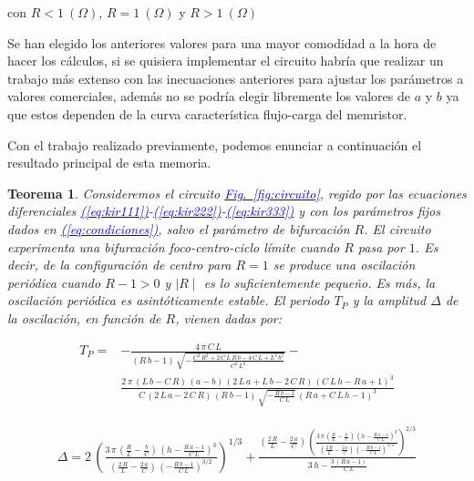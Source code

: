 \documentclass[12pt,a4paper]{report} %
\newtheorem{theorem}{Teorema}[chapter]
\newcommand{\fref}[1]{\hyperref[#1]{\textcolor{blue}{Fig.~\ref*{#1}}}}
\newcommand{\eref}[1]{\hyperref[#1]{\textcolor{blue}{(\ref*{#1})}}}
\begin{document}
	\noindent \noindent con $R<1\:(\Omega)$, $R=1\:(\Omega)$ y $R>1\:(\Omega)$
	
	\vspace{0.5cm} Se han elegido los anteriores valores para una mayor comodidad a la hora de hacer los cálculos, si se quisiera implementar el circuito habría que realizar un trabajo más extenso con las inecuaciones anteriores para ajustar los parámetros a valores comerciales, además no se podría elegir libremente los valores de $a$ y $b$ ya que estos dependen de la curva característica flujo-carga del memristor.
	
	\vspace{0.5cm} Con el trabajo realizado previamente, podemos enunciar a continuación el resultado principal de esta memoria.
	
	\begin{theorem}
		\label{teo.principal}
		Consideremos el circuito \fref{fig:circuito}, regido por las ecuaciones diferenciales \eref{eq:kir111}-\eref{eq:kir222}-\eref{eq:kir333} y con los parámetros fijos dados en \eref{eq:condiciones}, salvo el parámetro de bifurcación $R$. El circuito experimenta una bifurcación foco-centro-ciclo límite cuando $R$ pasa por $1$. Es decir, de la configuración de centro para $R=1$ se produce una oscilación periódica  cuando $R-1>0$ y $\mid R \mid$ es lo suficientemente pequeño. Es más, la oscilación periódica es asintóticamente estable. El periodo $T_P$ y la amplitud $\varDelta$ de la oscilación, en función de $R$, vienen dadas por:
		
		\begin{equation}
			\label{eq:perR}
			\begin{aligned}
			T_P=&-\frac{4\,\pi \,C\,L}{\left(R\,b-1\right)\,\sqrt{-\frac{C^2\,R^2+2\,C\,L\,R\,b-4\,C\,L+L^2\,b^2}{C^2\,L^2}}}- \\
			&\frac{2\,\pi \,\left(L\,b-C\,R\right)\,\left(a-b\right)\,\left(2\,L\,a+L\,b-2\,C\,R\right)\,{\left(C\,L\,h-R\,a+1\right)}^3}{C\,\left(2\,L\,a-2\,C\,R\right)\,\left(R\,b-1\right)\,\sqrt{-\frac{R\,b-1}{C\,L}}\,{\left(R\,a+C\,L\,h-1\right)}^3}
			\end{aligned}	
		\end{equation}\smallskip
		
		\begin{equation}
			\label{eq:ampR}
			\begin{aligned}
				\varDelta=2\,{\left(\frac{3\,\pi \,\left(\frac{R}{L}-\frac{b}{C}\right)\,{\left(h-\frac{R\,a-1}{C\,L}\right)}^3}{\left(\frac{2\,R}{L}-\frac{2\,a}{C}\right)\,{\left(-\frac{R\,b-1}{C\,L}\right)}^{3/2}}\right)}^{1/3}+\frac{\left(\frac{2\,R}{L}-\frac{2\,a}{C}\right)\,{\left(\frac{3\,\pi \,\left(\frac{R}{L}-\frac{b}{C}\right)\,{\left(h-\frac{R\,a-1}{C\,L}\right)}^3}{\left(\frac{2\,R}{L}-\frac{2\,a}{C}\right)\,{\left(-\frac{R\,b-1}{C\,L}\right)}^{3/2}}\right)}^{2/3}}{3\,h-\frac{3\,\left(R\,a-1\right)}{C\,L}}
			\end{aligned}
		\end{equation}
		
		
	\end{theorem}\smallskip
	
\end{document}
